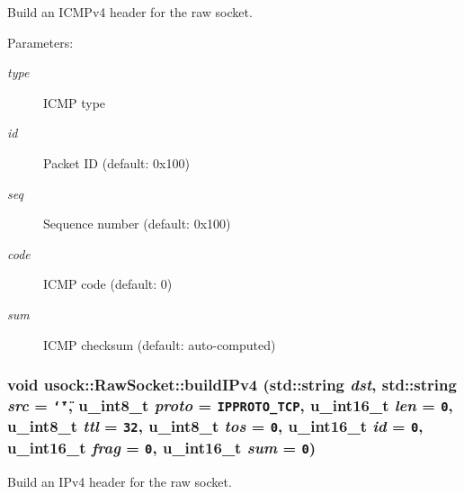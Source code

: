 Build an ICMPv4 header for the raw socket. 

\begin{Desc}
\item[Parameters:]
\begin{description}
\item[{\em type}]ICMP type \item[{\em id}]Packet ID (default: 0x100) \item[{\em seq}]Sequence number (default: 0x100) \item[{\em code}]ICMP code (default: 0) \item[{\em sum}]ICMP checksum (default: auto-computed) \end{description}
\end{Desc}
\hypertarget{classusock_1_1RawSocket_999a433a049b33006ab8c26a7d0875b9}{
\subsubsection[{buildIPv4}]{\setlength{\rightskip}{0pt plus 5cm}void usock::RawSocket::buildIPv4 (std::string {\em dst}, \/  std::string {\em src} = {\tt \char`\"{}\char`\"{}}, \/  u\_\-int8\_\-t {\em proto} = {\tt IPPROTO\_\-TCP}, \/  u\_\-int16\_\-t {\em len} = {\tt 0}, \/  u\_\-int8\_\-t {\em ttl} = {\tt 32}, \/  u\_\-int8\_\-t {\em tos} = {\tt 0}, \/  u\_\-int16\_\-t {\em id} = {\tt 0}, \/  u\_\-int16\_\-t {\em frag} = {\tt 0}, \/  u\_\-int16\_\-t {\em sum} = {\tt 0})}}
\label{classusock_1_1RawSocket_999a433a049b33006ab8c26a7d0875b9}


Build an IPv4 header for the raw socket. 

